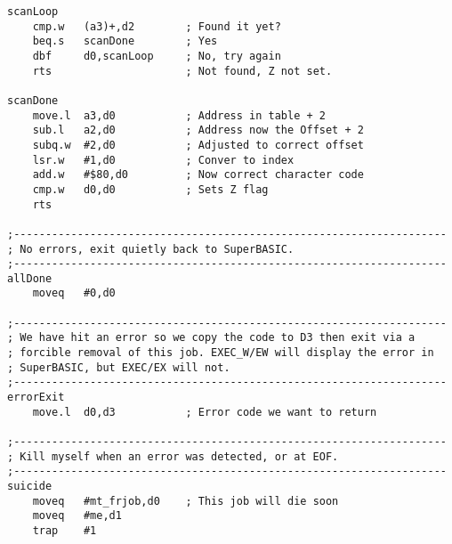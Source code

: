 \begin{lstlisting}[firstnumber=1, caption={Wolfgang's improved utf82ql Utility}]
scanLoop
    cmp.w   (a3)+,d2        ; Found it yet?
    beq.s   scanDone        ; Yes
    dbf     d0,scanLoop     ; No, try again
    rts                     ; Not found, Z not set.

scanDone
    move.l  a3,d0           ; Address in table + 2
    sub.l   a2,d0           ; Address now the Offset + 2
    subq.w  #2,d0           ; Adjusted to correct offset
    lsr.w   #1,d0           ; Conver to index
    add.w   #$80,d0         ; Now correct character code
    cmp.w   d0,d0           ; Sets Z flag
    rts

;--------------------------------------------------------------------
; No errors, exit quietly back to SuperBASIC.
;--------------------------------------------------------------------
allDone
    moveq   #0,d0

;--------------------------------------------------------------------
; We have hit an error so we copy the code to D3 then exit via a
; forcible removal of this job. EXEC_W/EW will display the error in
; SuperBASIC, but EXEC/EX will not.
;--------------------------------------------------------------------
errorExit
    move.l  d0,d3           ; Error code we want to return

;--------------------------------------------------------------------
; Kill myself when an error was detected, or at EOF.
;--------------------------------------------------------------------
suicide
    moveq   #mt_frjob,d0    ; This job will die soon
    moveq   #me,d1
    trap    #1


\end{lstlisting}
